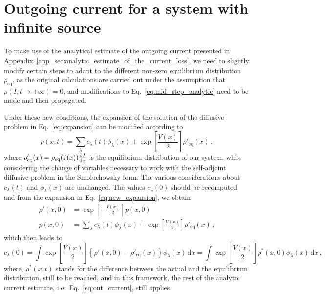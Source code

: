 
\section{Outgoing current for a system with infinite source}\label{app_sec:outgoing_current_for_a_system_with_infinite_source}


To make use of the analytical  estimate of the outgoing current presented in Appendix~\ref{app_sec:analytic_estimate_of_the_current_loss}, we need to slightly modify certain steps to adapt to the different non-zero equilibrium distribution $\rho_\text{eq}$, as the original calculations are carried out under the assumption that $\rho(I,t\to+\infty)=0$, and modifications to Eq.~\eqref{eq:mid_step_analytic} need to be made and then propagated.

Under these new conditions, the expansion of the solution of the diffusive problem in Eq.~\eqref{eq:expansion} can be modified according to 
\begin{equation}
    p(x, t) = \sum_\lambda c_\lambda(t) \phi_\lambda(x) + \exp\left[\frac{V(x)}{2}\right] \rho'_\text{eq}(x)\,,
    \label{eq:new_expansion}
\end{equation}
where $\rho'_\text{eq}(x) = \rho_\text{eq}(I(x))\dv{I}{x}$ is the equilibrium distribution of our system, while considering the change of variables necessary to work with the self-adjoint diffusive problem in the Smoluchowsky form. The various considerations about $c_\lambda(t)$ and $\phi_\lambda(x)$ are unchanged. The values $c_\lambda(0)$ should be recomputed and from the expansion in Eq.~\eqref{eq:new_expansion}, we obtain
\begin{align}
    \rho'(x, 0) &= \exp\left[-\frac{V(x)}{2}\right]p(x,0)\\
    p(x, 0) &= \sum_\lambda c_\lambda(t) \phi_\lambda(x) + \exp\left[\frac{V(x)}{2}\right] \rho'_\text{eq}(x)\,,
\end{align}
which then leads to
\begin{equation}
    c_\lambda(0) = \int \exp\left[\frac{V(x)}{2}\right] \left\{\rho'(x,0) - \rho'_\text{eq}(x)\right\}\phi_\lambda(x)\, \mathrm{d}x = \int \exp\left[\frac{V(x)}{2}\right] \rho^\ast(x,0)\phi_\lambda(x)\, \mathrm{d}x\,,
\end{equation}
where, $\rho^\ast(x,t)$ stands for the difference between the actual and the equilibrium distribution, still to be reached, and in this framework, the rest of the analytic current estimate, i.e.\ Eq.~\eqref{eq:out_current}, still applies.

